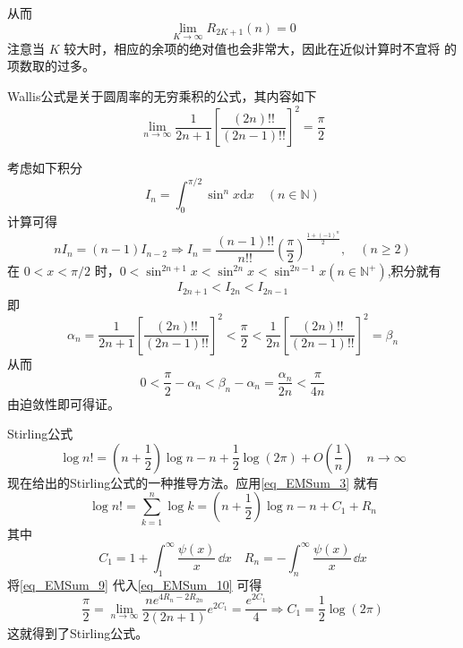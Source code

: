 从而
\[
    \lim\limits_{K\to\infty}R_{2K+1}(n)=0	
\]
注意当 $K$ 较大时，相应的余项的绝对值也会非常大，因此在近似计算时不宜将 的项数取的过多。
\begin{lemma}{}
Wallis公式是关于圆周率的无穷乘积的公式，其内容如下
		\begin{equation}\label{eq_EMSum_10}
			\lim_{n\to\infty}\frac{1}{2n+1}\left[\frac{(2n)!!}{(2n-1)!!}\right]^2=\frac{\pi}{2}
		\end{equation}
\end{lemma}
考虑如下积分
\begin{equation}
    I_{n}=\int_{0}^{\pi/2}\sin^{n}x\mathrm{d}x\quad(n\in{\mathbb{N}})
\end{equation}
计算可得
\[
    nI_{n}=(n-1)I_{n-2}\Rightarrow I_{n}=\frac{(n-1)!!}{n!!}
    \left(\frac{\pi}{2}\right)^{\frac{1+(-1)^n}{2}}, \quad (n\geqslant2)
\]
在 $0<x<\pi/2$ 时，$0<\sin^{2n+1}x<\sin^{2n}x<\sin^{2n-1}x(n\in{\mathbb{N}^{+}})$,积分就有
\[
    I_{2n+1}<I_{2n}<I_{2n-1}
\]
即
\[
    \alpha_{n}=\frac{1}{2n+1}\left[\frac{(2n)!!}{(2n-1)!!}\right]^2<\frac{\pi}{2}<\frac{1}{2n}\left[\frac{(2n)!!}{(2n-1)!!}\right]^2=\beta_{n}
\]
从而
\[
    0<\frac{\pi}{2}-\alpha_{n}<\beta_{n}-\alpha_{n}=\frac{\alpha_{n}}{2n}<\frac{\pi}{4n}
\]
由迫敛性即可得证。
\begin{example}{Stirling公式}
\begin{equation}
    \log n!=\left(n+\frac{1}{2}\right)\log n-n+\frac{1}{2}\log(2\pi)
    +O\left(\frac{1}{n}\right)\quad n\to\infty
\end{equation}
现在给出的Stirling公式的一种推导方法。应用\autoref{eq_EMSum_3} 就有
\begin{equation}\label{eq_EMSum_9}
    \log n!=\sum_{k=1}^{n}\log k=\left(n+\frac{1}{2}\right)\log n-n+C_{1}+R_{n}
\end{equation}
其中
\[
    C_{1}=1+\int_{1}^{\infty}\frac{\psi(x)}{x}\,\dd x\quad
    R_{n}=-\int_{n}^{\infty}\frac{\psi(x)}{x}\,\dd x
\]
将\autoref{eq_EMSum_9} 代入\autoref{eq_EMSum_10} 可得
\[
    \frac{\pi}{2}=\lim_{n\to\infty}\frac{ne^{4R_n-2R_{2n}}}{2(2n+1)}e^{2C_{1}}
    =\frac{e^{2C_{1}}}{4}\Rightarrow C_{1}=\frac{1}{2}\log(2\pi)
\]
这就得到了Stirling公式。
\end{example}
